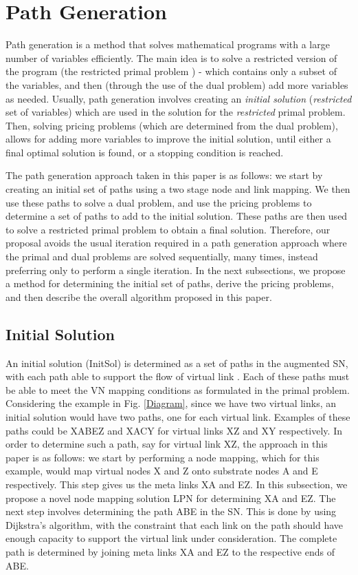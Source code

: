 \documentclass[journal]{IEEEtran}
\begin{document}
\section{Path Generation}
Path generation is a method that solves mathematical programs with a large number of variables efficiently. The main idea is to solve a restricted version of the program (the restricted primal problem \cite{Goemans97}) - which contains only a subset of the variables, and then (through the use of the dual problem\cite{Goemans97}) add more variables as needed. Usually, path generation involves creating an \textit{initial solution} (\textit{restricted} set of variables) which are used in the solution for the \textit{restricted} primal problem. Then, solving pricing problems (which are determined from the dual problem), allows for adding more variables to improve the initial solution, until either a final optimal solution is found, or a stopping condition is reached.

The path generation approach taken in this paper is as follows: we start by creating an initial set of paths using a two stage node and link mapping. We then use these paths to solve a dual problem, and use the pricing problems to determine a set of paths to add to the initial solution. These paths are then used to solve a restricted primal problem to obtain a final solution. Therefore, our proposal avoids the usual iteration required in a path generation approach where the primal and dual problems are solved sequentially, many times, instead preferring only to perform a single iteration. In the next subsections, we propose a method for determining the initial set of paths, derive the pricing problems, and then describe the overall algorithm proposed in this paper.

\subsection{Initial Solution}
An initial solution (InitSol) is determined as a set of paths  in the augmented \ac{SN}, with each path  able to support the flow  of virtual link . Each of these paths must be able to meet the \ac{VN} mapping conditions as formulated in the primal problem. Considering the example in Fig. \ref{Diagram}, since we have two virtual links, an initial solution would have two paths, one for each virtual link. Examples of these paths could be XABEZ and XACY for virtual links XZ and XY respectively. In order to determine such a path, say for virtual link XZ, the approach in this paper is as follows: we start by performing a node mapping, which for this example, would map virtual nodes X and Z onto substrate nodes A and E respectively. This step gives us the meta links XA and EZ. In this subsection, we propose a novel node mapping solution LPN for determining XA and EZ. The next step involves determining the path ABE in the \ac{SN}. This is done by using Dijkstra's algorithm, with the constraint that each link on the path should have enough capacity to support the virtual link under consideration. The complete path is determined by joining meta links XA and EZ to the respective ends of ABE.\\
\end{document}

